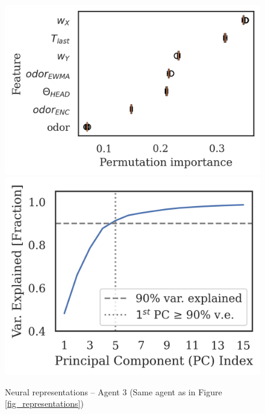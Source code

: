 \documentclass[5p,twocolumn,authoryear]{elsarticle}
\begin{document}
\begin{figure}[h!]
\begin{center}
\includegraphics[width=0.34\linewidth]{repr_3307e9.png}
\includegraphics[width=0.30\linewidth]{scree_3307e9.png}
\caption[Neural representations -- Agent 3]{Neural representations -- Agent 3 (Same agent as in Figure \ref{fig_representations})}
\end{center}
\end{figure}
\end{document}
